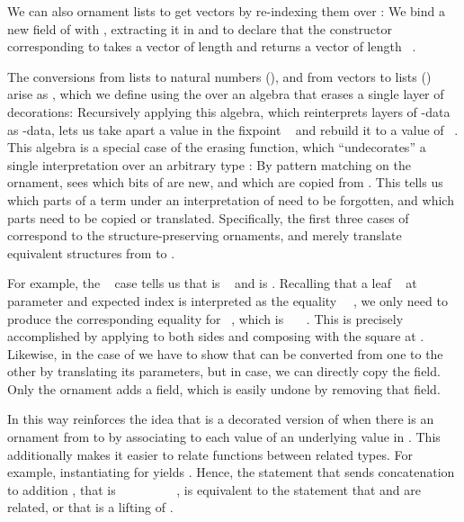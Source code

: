 We can also ornament lists to get vectors by re-indexing them over \bN{}:
We bind a new field of \bN{} with , extracting it in  and  to declare that the constructor corresponding to  takes a vector of length  and returns a vector of length \ . 

The conversions from lists to natural numbers (), and from vectors to lists () arise as , which we define using the  over an algebra that erases a single layer of decorations:
Recursively applying this algebra, which reinterprets layers of -data as -data, lets us take apart a value in the fixpoint \  and rebuild it to a value of \ . This algebra
is a special case of the erasing function, which ``undecorates'' a single interpretation over an arbitrary type :
By pattern matching on the ornament,  sees which bits of  are new, and which are copied from . This tells us which parts of a term  under an interpretation of  need to be forgotten, and which parts need to be copied or translated. Specifically, the first three cases of  correspond to the structure-preserving ornaments, and merely translate equivalent structures from  to .

For example, the \  case tells us that  is \  and  is  . Recalling that a leaf \  at parameter  and expected index  is interpreted as the equality \ \ , we only need to produce the corresponding equality for  \ , which is \ \ \ . This is precisely accomplished by applying  to both sides and composing with the square  at . Likewise, in the case of  we have to show that  can be converted from one  to the other  by translating its parameters, but in  case, we can directly copy the field. Only the ornament  adds a field, which is easily undone by removing that field.

In this way  reinforces the idea that  is a decorated version of  when there is an ornament from  to  by associating to each value of  an underlying value in . This additionally makes it easier to relate functions between related types. For example, instantiating  for  yields . Hence, the statement that  sends concatenation \AF{\_++\_} to addition \AF{\_+\_}, that is \ \ \AF{++}\ \ \ \ \ \AF{+}\ \ , is equivalent to the statement that \AF{\_++\_} and \AF{\_+\_} are related, or that \AF{\_++\_} is a lifting of \AF{\_+\_} \cite{orntrans}.

